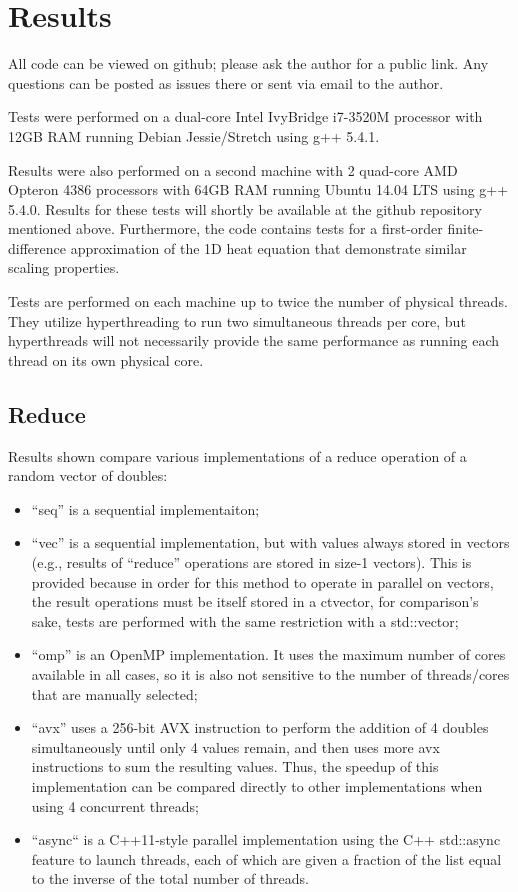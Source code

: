 \documentclass[pageno]{jpaper}
\begin{document}
\section{Results}

All code can be viewed on github; please ask the author for a public link. Any
questions can be posted as issues there or sent via email to the author.

Tests were performed on a dual-core Intel IvyBridge i7-3520M processor with 12GB
RAM running Debian Jessie/Stretch using g++ 5.4.1.

Results were also performed on a second machine with 2 quad-core AMD Opteron
4386 processors with 64GB RAM running Ubuntu 14.04 LTS using g++ 5.4.0. Results
for these tests will shortly be available at the github repository mentioned
above. Furthermore, the code contains tests for a first-order finite-difference
approximation of the 1D heat equation that demonstrate similar scaling
properties.

Tests are performed on each machine up to twice the number of physical threads.
They utilize hyperthreading to run two simultaneous threads per core, but
hyperthreads will not necessarily provide the same performance as running each
thread on its own physical core.

\subsection{Reduce}
Results shown compare various implementations of a reduce operation of a random
vector of doubles:

\begin{itemize}
 \item ``seq'' is a sequential implementaiton;
 \item ``vec'' is a sequential implementation, but with values always stored in
 vectors (e.g., results of ``reduce'' operations are stored in size-1 vectors).
 This is provided because in order for this method to operate in parallel on
 vectors, the result operations must be itself stored in a ctvector, for
 comparison's sake, tests are performed with the same restriction with a
 std::vector;
 \item ``omp'' is an OpenMP implementation. It uses the maximum number of cores
 available in all cases, so it is also not sensitive to the number of
 threads/cores that are manually selected;
 \item ``avx'' uses a 256-bit AVX instruction to perform the addition of 4 doubles
 simultaneously until only 4 values remain, and then uses more avx instructions
 to sum the resulting values. Thus, the speedup of this implementation can be
 compared directly to other implementations when using 4 concurrent threads;
 \item ``async`` is a C++11-style parallel implementation using the C++ std::async
 feature to launch threads, each of which are given a fraction of the list equal
 to the inverse of the total number of threads.
\end{itemize}
\end{document}
